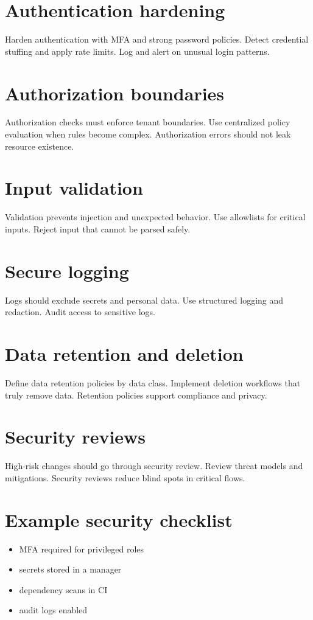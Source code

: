 \section{Authentication hardening}
Harden authentication with MFA and strong password policies.
Detect credential stuffing and apply rate limits.
Log and alert on unusual login patterns.

\section{Authorization boundaries}
Authorization checks must enforce tenant boundaries.
Use centralized policy evaluation when rules become complex.
Authorization errors should not leak resource existence.

\section{Input validation}
Validation prevents injection and unexpected behavior.
Use allowlists for critical inputs.
Reject input that cannot be parsed safely.

\section{Secure logging}
Logs should exclude secrets and personal data.
Use structured logging and redaction.
Audit access to sensitive logs.

\section{Data retention and deletion}
Define data retention policies by data class.
Implement deletion workflows that truly remove data.
Retention policies support compliance and privacy.

\section{Security reviews}
High-risk changes should go through security review.
Review threat models and mitigations.
Security reviews reduce blind spots in critical flows.

\section{Example security checklist}
\begin{itemize}[nosep]
  \item MFA required for privileged roles
  \item secrets stored in a manager
  \item dependency scans in CI
  \item audit logs enabled
\end{itemize}

